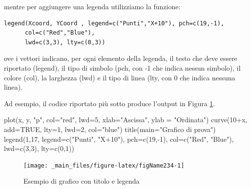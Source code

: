 \documentclass[a4paper,12pt,oneside]{book}
\newenvironment{Shaded}{\begin{snugshade}}{\end{snugshade}}
\newcommand{\DecValTok}[1]{#1}
\newcommand{\ConstantTok}[1]{#1}
\newcommand{\SpecialCharTok}[1]{#1}
\newcommand{\StringTok}[1]{#1}
\newcommand{\FunctionTok}[1]{#1}
\newcommand{\AttributeTok}[1]{#1}
\newcommand{\NormalTok}[1]{#1}
\begin{document}
mentre per aggiungere una legenda utilizziamo la funzione:

\begin{verbatim}
legend(Xcoord, YCoord , legend=c("Punti","X+10"), pch=c(19,-1),
      col=c("Red","Blue"),
      lwd=c(3,3), lty=c(0,3))
\end{verbatim}

ove i vettori indicano, per ogni elemento della legenda, il testo che deve essere riportato (legend), il tipo di simbolo (pch, con -1 che indica nessun simbolo), il colore (col), la larghezza (lwd) e il tipo di linea (lty, con 0 che indica nessuna linea).

Ad esempio, il codice riportato più sotto produce l'output in Figura \ref{fig:figName234}.

\begin{Shaded}
\begin{Highlighting}[]
\FunctionTok{plot}\NormalTok{(x, y, }\StringTok{"p"}\NormalTok{, }\AttributeTok{col=}\StringTok{"red"}\NormalTok{, }\AttributeTok{lwd=}\DecValTok{5}\NormalTok{, }\AttributeTok{xlab=}\StringTok{"Ascissa"}\NormalTok{, }
       \AttributeTok{ylab =} \StringTok{"Ordinata"}\NormalTok{)}
\FunctionTok{curve}\NormalTok{(}\DecValTok{10}\SpecialCharTok{+}\NormalTok{x, }\AttributeTok{add=}\ConstantTok{TRUE}\NormalTok{, }\AttributeTok{lty=}\DecValTok{1}\NormalTok{, }\AttributeTok{lwd=}\DecValTok{2}\NormalTok{, }\AttributeTok{col=}\StringTok{"blue"}\NormalTok{)}
\FunctionTok{title}\NormalTok{(}\AttributeTok{main=}\StringTok{"Grafico di prova"}\NormalTok{)}
\FunctionTok{legend}\NormalTok{(}\DecValTok{1}\NormalTok{,}\DecValTok{17}\NormalTok{, }\AttributeTok{legend=}\FunctionTok{c}\NormalTok{(}\StringTok{"Punti"}\NormalTok{, }\StringTok{"X+10"}\NormalTok{), }\AttributeTok{pch=}\FunctionTok{c}\NormalTok{(}\DecValTok{19}\NormalTok{,}\SpecialCharTok{{-}}\DecValTok{1}\NormalTok{), }
  \AttributeTok{col=}\FunctionTok{c}\NormalTok{(}\StringTok{"Red"}\NormalTok{, }\StringTok{"Blue"}\NormalTok{), }\AttributeTok{lwd=}\FunctionTok{c}\NormalTok{(}\DecValTok{3}\NormalTok{,}\DecValTok{3}\NormalTok{), }\AttributeTok{lty=}\FunctionTok{c}\NormalTok{(}\DecValTok{0}\NormalTok{,}\DecValTok{1}\NormalTok{))}
\end{Highlighting}
\end{Shaded}

\begin{figure}

{\centering \texttt{[image: \_main\_files/figure-latex/figName234-1]} 

}

\caption{Esempio di grafico con titolo e legenda}\label{fig:figName234}
\end{figure}
\end{document}
